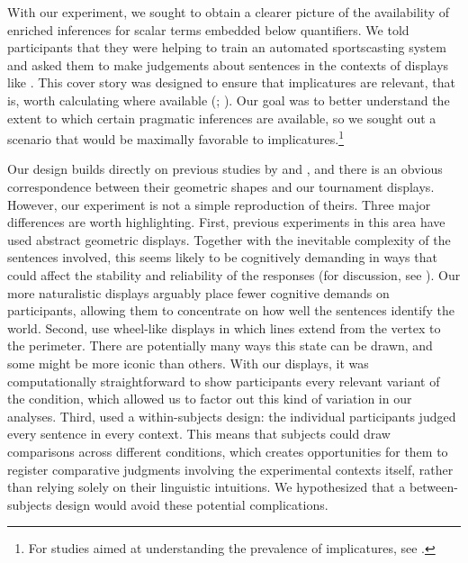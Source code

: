 \documentclass[leqno,12pt]{article}
\begin{document}
With our experiment, we sought to obtain a clearer picture of the
availability of enriched inferences for scalar terms embedded below
quantifiers. We told participants that they were helping to train an
automated sportscasting system and asked them to make judgements about
sentences in the contexts of displays like .  This
cover story was designed to ensure that implicatures are relevant,
that is, worth calculating where available
(;
\citealt{Clifton:Dube:2010}). Our goal was to better understand the
extent to which certain pragmatic inferences are available, so we
sought out a scenario that would be maximally favorable to
implicatures.\footnote{For studies aimed at understanding the
  prevalence of implicatures, see
  \citealt{Paris:1973,Hendriks-etal:2009}.}

Our design builds directly on previous studies by
\citet{Geurts:Pouscoulous:2009} and \citet{Chemla:Spector:2011}, and
there is an obvious correspondence between their geometric shapes and
our tournament displays. However, our experiment is not a simple
reproduction of theirs. Three major differences are worth
highlighting. First, previous experiments in this area have used
abstract geometric displays. Together with the inevitable complexity
of the sentences involved, this seems likely to be cognitively
demanding in ways that could affect the stability and reliability of
the responses (for discussion, see \citealt{Clifton:Dube:2010}). Our
more naturalistic displays arguably place fewer cognitive demands on
participants, allowing them to concentrate on how well the sentences
identify the world.  Second, \citeauthor{Chemla:Spector:2011} use
wheel-like displays in which lines extend from the vertex to the
perimeter. There are potentially many ways this state can be drawn,
and some might be more iconic than others. With our displays, it was
computationally straightforward to show participants every relevant
variant of the condition, which allowed us to factor out this kind of
variation in our analyses.  Third, \citeauthor{Chemla:Spector:2011}
used a within-subjects design: the individual participants judged
every sentence in every context. This means that subjects could draw
comparisons across different conditions, which creates opportunities
for them to register comparative judgments involving the experimental
contexts itself, rather than relying solely on their linguistic
intuitions. We hypothesized that a between-subjects design would avoid
these potential complications.
\end{document}
